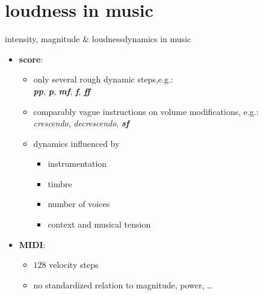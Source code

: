     \section[music]{loudness in music}
        \begin{frame}{intensity, magnitude \& loudness}{dynamics in music}
            \begin{itemize}
                \item	\textbf{score}:
                        \begin{itemize}
                            \item	only several rough dynamic steps,e.g.:\\ \emph{\textbf{pp}}, \textit{\textbf{p}}, \emph{\textbf{mf}}, \emph{\textbf{f}}, \emph{\textbf{ff}}
                            \item<1->	comparably vague instructions on volume modifications, e.g.:\\ \textsl{crescendo}, \textsl{decrescendo}, \emph{\textbf{sf}}
                            \item<1->	dynamics influenced by
                                    \begin{itemize}
                                        \item	instrumentation
                                        \item	timbre
                                        \item	number of voices
                                        \item	context and musical tension
                                    \end{itemize}
                        \end{itemize}
                \smallskip
                \item<2->	\textbf{MIDI}:
                        \begin{itemize}
                            \item	$128$ velocity steps
                            \item	no standardized relation to magnitude, power, \ldots
                        \end{itemize}
            \end{itemize}
        \end{frame}


